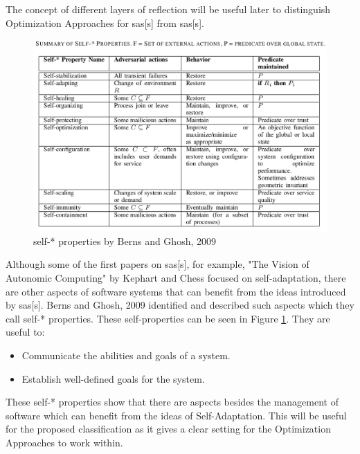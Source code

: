 \noindent The concept of different layers of reflection will be useful later to distinguish
Optimization Approaches for \acrlong{sas}[s] from \acrlong{sas}[s].

\begin{figure}[t!]
    \includegraphics[width=\textwidth]{images/SelfProperties.png}
    \caption{self-* properties by Berns and Ghosh, 2009 \cite*{DissectingSelfProperties}}
    \label{fig:SelfProperties}
\end{figure}
\noindent Although some of the first papers on \acrlong{sas}[s], for example, 
"The Vision of Autonomic Computing" by Kephart and Chess \cite*{VisionOfAutonomicComputing} focused on self-adaptation,
there are other aspects of software systems that can benefit from the ideas introduced by \acrlong{sas}[s].
Berns and Ghosh, 2009 \cite*{DissectingSelfProperties} identified and described such aspects which they call self-* properties.
These self-properties can be seen in Figure \ref{fig:SelfProperties}.
They are useful to:
\begin{itemize}[nosep]
    \item Communicate the abilities and goals of a system.
    \item Establish well-defined goals for the system.
\end{itemize}

\noindent These self-* properties show that there are aspects besides the management of software which can benefit from the ideas of Self-Adaptation.
This will be useful for the proposed classification as it gives a clear setting for the Optimization Approaches to work within.

